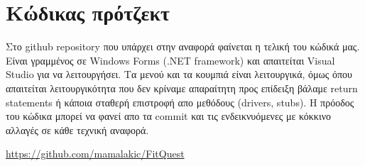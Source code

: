 \section{Κώδικας πρότζεκτ}

Στο github repository που υπάρχει στην αναφορά φαίνεται η τελική του κώδικά μας. Είναι γραμμένος σε Windows Forms (.NET framework) και απαιτείται Visual Studio για να λειτουργήσει. Τα μενού και τα κουμπιά είναι λειτουργικά, όμως όπου απαιτείται λειτουργικότητα που δεν κρίναμε απαραίτητη προς επίδειξη βάλαμε return statements ή κάποια σταθερή επιστροφή απο μεθόδους (drivers, stubs). Η πρόοδος του κώδικα μπορεί να φανεί απο τα commit και τις ενδεικνυόμενες με κόκκινο αλλαγές σε κάθε τεχνική αναφορά.

\url{https://github.com/mamalakic/FitQuest}